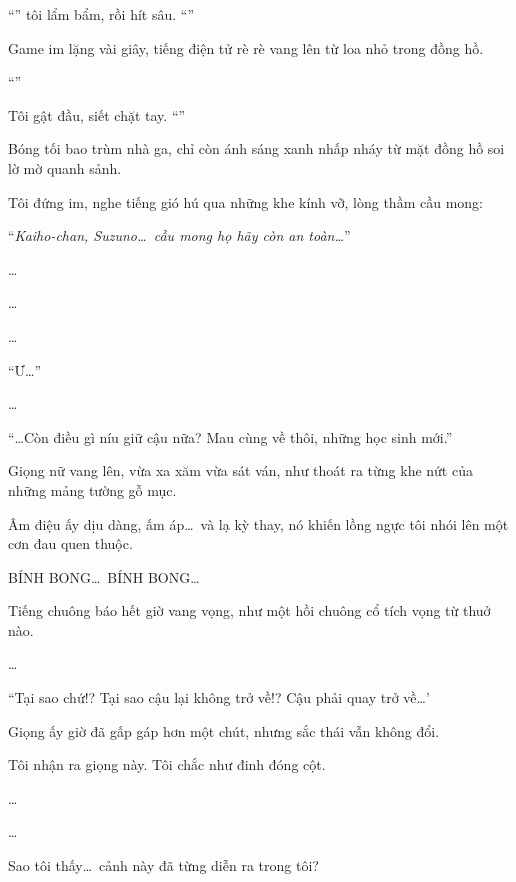 \documentclass[../main.tex]{subfiles}
\begin{document}
``'' tôi lẩm bẩm, rồi hít sâu. ``''

Game im lặng vài giây, tiếng điện tử rè rè vang lên từ loa nhỏ trong đồng hồ.

``''

Tôi gật đầu, siết chặt tay. ``''

Bóng tối bao trùm nhà ga, chỉ còn ánh sáng xanh nhấp nháy từ mặt đồng hồ soi lờ mờ quanh sảnh.

Tôi đứng im, nghe tiếng gió hú qua những khe kính vỡ, lòng thầm cầu mong:

\begin{center}
    ``\textit{Kaiho-chan, Suzuno\dots\ cầu mong họ hãy còn an toàn\dots}''
\end{center}

\dots

\dots


\dots

``Ư\dots''

\dots

``\dots Còn điều gì níu giữ cậu nữa? Mau cùng về thôi, những học sinh mới.''

Giọng nữ vang lên, vừa xa xăm vừa sát ván, như thoát ra từng khe nứt của những mảng tường gỗ mục.

Âm điệu ấy dịu dàng, ấm áp\dots\ và lạ kỳ thay, nó khiến lồng ngực tôi nhói lên một cơn đau quen thuộc.

BÍNH BONG\dots\ BÍNH BONG\dots

Tiếng chuông báo hết giờ vang vọng, như một hồi chuông cổ tích vọng từ thuở nào.

\dots

``Tại sao chứ!? Tại sao cậu lại không trở về!? Cậu phải quay trở về\dots'

Giọng ấy giờ đã gấp gáp hơn một chút, nhưng sắc thái vẫn không đổi.

Tôi nhận ra giọng này. Tôi chắc như đinh đóng cột.

\dots

\dots

Sao tôi thấy\dots\ cảnh này đã từng diễn ra trong tôi?
\end{document}
